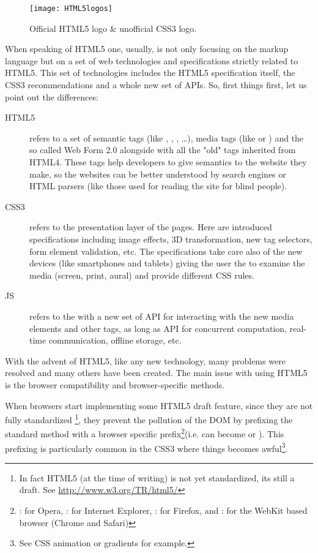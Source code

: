 \begin{figure}[htb]
    \centering
    \texttt{[image: HTML5logos]}
    \caption{Official HTML5 logo \& unofficial CSS3 logo.}
    \label{fig:html-logos}
\end{figure}

When speaking of \ac{HTML}5 one, usually, is not only focusing on the markup language
but on a set of web technologies and specifications strictly related to \ac{HTML}5.
This set of technologies includes the \ac{HTML}5 specification itself, the
\ac{CSS}3 recommendations and a whole new set of \js{} APIs. So, first things
first, let us point out the differences:
\begin{description}
	\item[HTML5] refers to a set of semantic tags (like ,
	, , \ldots), media tags (like  or
	) and the so called Web Form 2.0 alongside with all the "old"
	tags inherited from HTML4. These tags help developers to give semantics to
	the website they make, so the websites can be
	better understood by search engines or HTML parsers (like those used for
	reading the site for blind people).

	\item[CSS3] refers to the presentation layer of the pages. Here are introduced
	specifications including image effects, 3D transformation, new tag selectors, 
	form element validation, etc. The specifications take care also of the new
	devices (like smartphones and tablets) giving the user the  to examine the media (screen, print, aural) and provide different
	\ac{CSS} rules.
	
	\item[JS] refers to the \js{} with a new set of API for interacting with the
	new media elements and other tags, as long as API for concurrent computation,
	real-time communication, offline storage, etc.\\
\end{description}

With the advent of \ac{HTML}5, like any new technology, many problems were
resolved and many others have been created. The main issue with using \ac{HTML}5
is the browser compatibility and browser-specific methods.

When browsers start
implementing some \ac{HTML}5 draft feature, since they are not fully standardized
\footnote{In fact HTML5 (at the time of writing) is not yet standardized, its
still a draft. See \url{http://www.w3.org/TR/html5/}}, they prevent the pollution
of the DOM by prefixing the standard method
with a browser specific prefix\footnote{: for
Opera, : for Internet Explorer, : for Firefox, and
: for the WebKit based browser (Chrome and Safari)}(i.e.
\linebreak{}
can become  or ). This prefixing
is particularly common in the \ac{CSS}3 where things becomes awful\footnote{See
CSS animation or gradients for example.}.\\



